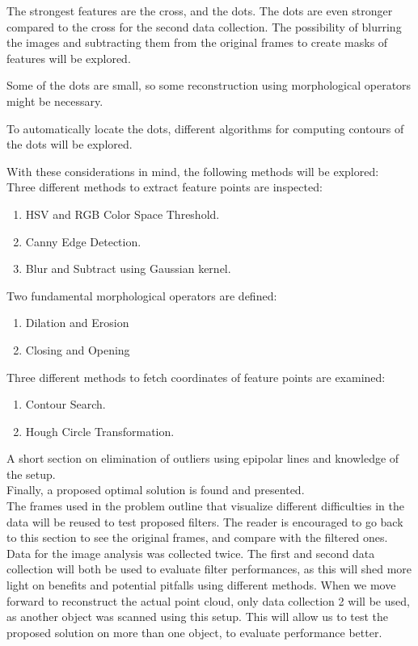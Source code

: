 The strongest features are the cross, and the dots. The dots are even stronger compared to the cross for the second data collection. The possibility of blurring the images and subtracting them from the original frames to create masks of features will be explored.

Some of the dots are small, so some reconstruction using morphological operators might be necessary.

To automatically locate the dots, different algorithms for computing contours of the dots will be explored.


With these considerations in mind, the following methods will be explored:\\


Three different methods to extract feature points are inspected:
\begin{enumerate}
    \item HSV and RGB Color Space Threshold.
	\item Canny Edge Detection.
	\item Blur and Subtract using Gaussian kernel.
\end{enumerate}

Two fundamental morphological operators are defined:
\begin{enumerate}
	\item Dilation and Erosion
	\item Closing and Opening
\end{enumerate}

Three different methods to fetch coordinates of feature points are examined:
\begin{enumerate}
	\item Contour Search.
	\item Hough Circle Transformation.
\end{enumerate}

A short section on elimination of outliers using epipolar lines and knowledge of the setup. \\

Finally, a proposed optimal solution is found and presented.\\

The frames used in the problem outline that visualize different difficulties in the data will be reused to test proposed filters. The reader is encouraged to go back to this section to see the original frames, and compare with the filtered ones. \\

Data for the image analysis was collected twice. The first and second data collection will both be used to evaluate filter performances, as this will shed more light on benefits and potential pitfalls using different methods. When we move forward to reconstruct the actual point cloud, only data collection 2 will be used, as another object was scanned using this setup. This will allow us to test the proposed solution on more than one object, to evaluate performance better. 




